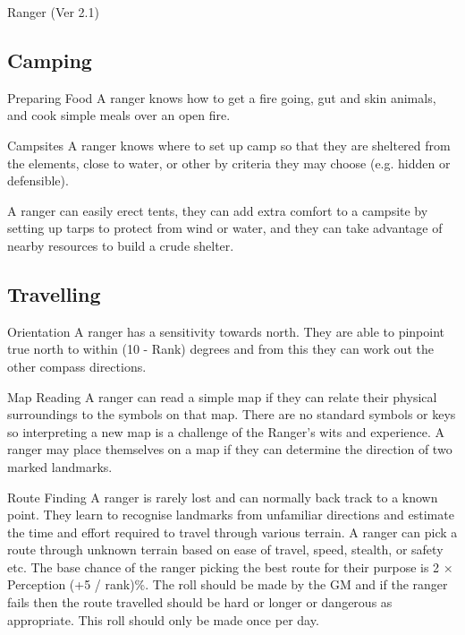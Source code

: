 \begin{Chapter}{Ranger (Ver 2.1)}
\begin{Description}
\end{Description}

\subsection{Camping}

\begin{Description}

\item[Preparing Food] A ranger knows how to get a fire going, gut and
  skin animals, and cook simple meals over an open fire.

\item[Campsites] A ranger knows where to set up camp so that they are
  sheltered from the elements, close to water, or other by criteria
  they may choose (e.g. hidden or defensible).

  A ranger can easily erect tents, they can add extra comfort to a
  campsite by setting up tarps to protect from wind or water, and they
  can take advantage of nearby resources to build a crude shelter.

\end{Description}

\subsection{Travelling}

\begin{Description}

\item[Orientation] A ranger has a sensitivity towards north. They are
  able to pinpoint true north to within (10 - Rank) degrees and from
  this they can work out the other compass directions.

\item[Map Reading] A ranger can read a simple map if they can relate
  their physical surroundings to the symbols on that map.  There are
  no standard symbols or keys so interpreting a new map is a challenge
  of the Ranger’s wits and experience.  A ranger may place themselves
  on a map if they can determine the direction of two marked
  landmarks.

\item[Route Finding] A ranger is rarely lost and can normally back
  track to a known point.  They learn to recognise landmarks from
  unfamiliar directions and estimate the time and effort required to
  travel through various terrain.  A ranger can pick a route through
  unknown terrain based on ease of travel, speed, stealth, or safety
  etc. The base chance of the ranger picking the best route for their
  purpose is 2 × Perception (+5 / rank)\%.  The roll should be made by
  the GM and if the ranger fails then the route travelled should be
  hard or longer or dangerous as appropriate.  This roll should only
  be made once per day.


\end{Description}
\end{Chapter}
